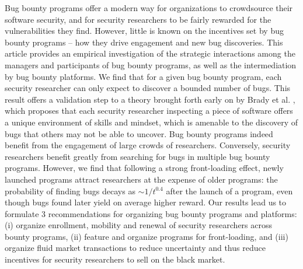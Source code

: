 Bug bounty programs offer a modern way for organizations to crowdsource their software security, and for security researchers to be fairly rewarded for the vulnerabilities they find. However, little is known on the incentives set by bug bounty programs -- how they drive engagement and new bug discoveries. This article provides an empirical investigation of the strategic interactions among the managers and participants of bug bounty programs, as well as the intermediation by bug bounty platforms. We find that for a given bug bounty program, each security researcher can only expect to discover a bounded number of bugs. This result offers a validation step to a theory brought forth early on by Brady et al. \cite{brady1999murphy}, which proposes that each security researcher inspecting a piece of software offers a unique environment of skills and mindset, which is amenable to the discovery of bugs that others may not be able to uncover. Bug bounty programs indeed benefit from the engagement of large crowds of researchers. Conversely, security researchers benefit greatly from searching for bugs in multiple bug bounty programs. However, we find that following a strong front-loading effect, newly launched programs attract researchers at the expense of older programs: the probability of finding bugs decays as $\sim 1/t^{0.4}$ after the launch of a program, even though bugs found later yield on average higher reward. Our results lead us to formulate 3 recommendations for organizing bug bounty programs and platforms: (i) organize enrollment, mobility and renewal of security researchers across bounty programs, (ii) feature and organize programs for front-loading, and (iii) organize fluid market transactions to reduce uncertainty and thus reduce incentives for security researchers to sell on the black market.



